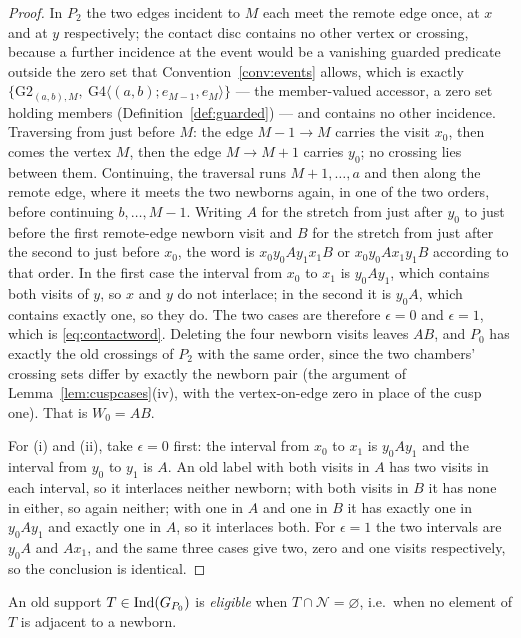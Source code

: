 \begin{proof}
In $P_2$ the two edges incident to $M$ each meet the remote edge once, at $x$
and at $y$ respectively; the contact disc contains no other vertex or crossing,
because a further incidence at the event would be a vanishing guarded predicate
outside the zero set that Convention~\ref{conv:events} allows, which is exactly
$\{\mathrm{G2}_{(a,b),M},\ \mathrm{G4}\langle (a,b);e_{M-1},e_M\rangle\}$ ---
the member-valued accessor, a zero set holding members
(Definition~\ref{def:guarded}) --- and contains no other incidence. Traversing from just before $M$: the
edge $M-1\to M$ carries the visit $x_0$, then comes the vertex $M$, then the
edge $M\to M+1$ carries $y_0$; no crossing lies between them. Continuing, the
traversal runs $M+1,\dots,a$ and then along the remote edge, where it meets the
two newborns again, in one of the two orders, before continuing $b,\dots,M-1$.
Writing $A$ for the stretch from just after $y_0$ to just before the first
remote-edge newborn visit and $B$ for the stretch from just after the second to
just before $x_0$, the word is $x_0y_0Ay_1x_1B$ or $x_0y_0Ax_1y_1B$ according
to that order. In the first case the interval from $x_0$ to $x_1$ is
$y_0Ay_1$, which contains both visits of $y$, so $x$ and $y$ do not interlace;
in the second it is $y_0A$, which contains exactly one, so they do. The two
cases are therefore $\epsilon=0$ and $\epsilon=1$, which is
\eqref{eq:contactword}. Deleting
the four newborn visits leaves $AB$, and $P_0$ has exactly the old crossings of
$P_2$ with the same order, since the two chambers' crossing sets differ by
exactly the newborn pair (the argument of Lemma~\ref{lem:cuspcases}(iv), with the
vertex-on-edge zero in place of the cusp one). That is $W_0=AB$.

For (i) and (ii), take $\epsilon=0$ first: the interval from $x_0$ to $x_1$ is
$y_0Ay_1$ and the interval from $y_0$ to $y_1$ is $A$. An old label with both
visits in $A$ has two visits in each interval, so it interlaces neither
newborn; with both visits in $B$ it has none in either, so again neither; with
one in $A$ and one in $B$ it has exactly one in $y_0Ay_1$ and exactly one in
$A$, so it interlaces both. For $\epsilon=1$ the two intervals are $y_0A$ and
$Ax_1$, and the same three cases give two, zero and one visits respectively, so
the conclusion is identical.
\end{proof}

\begin{definition}[eligible]\label{def:eligible}
An old support $T\in\operatorname{Ind}(G_{P_0})$ is \emph{eligible} when $T\cap\mathcal
N=\varnothing$, i.e.\ when no element of $T$ is adjacent to a newborn.
\end{definition}

